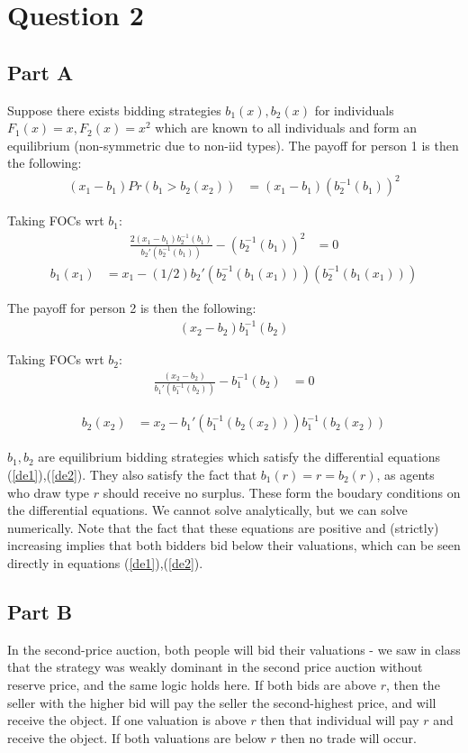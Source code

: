\documentclass[11pt]{article} %
\begin{document}
\section{Question 2}
\subsection{Part A}
Suppose there exists bidding strategies $b_1(x),b_2(x)$ for individuals $F_1(x) = x,F_2(x) = x^2$ which are known to all individuals and form an equilibrium (non-symmetric due to non-iid types). The payoff for person 1 is then the following:
\begin{align*}
(x_1-b_1)Pr(b_1>b_2(x_2)) &= (x_1-b_1)(b_2^{-1}(b_1))^2
\end{align*}

Taking FOCs wrt $b_1$:
\begin{align*}
\frac{2(x_1 - b_1)b_2^{-1}(b_1)}{b_2'(b_2^{-1}(b_1))}-(b_2^{-1}(b_1))^2 &= 0
\end{align*}
\begin{align}
b_1(x_1) &= x_1 - (1/2)b_2'(b_2^{-1}(b_1(x_1)))(b_2^{-1}(b_1(x_1)))  \label{de1}
\end{align}

The payoff for person 2 is then the following:
\begin{align*}
(x_2-b_2)b_1^{-1}(b_2)
\end{align*}

Taking FOCs wrt $b_2$:
\begin{align*}
\frac{(x_2 - b_2)}{b_1'(b_1^{-1}(b_2))}-b_1^{-1}(b_2) &= 0
\end{align*}

\begin{align}
b_2(x_2) &= x_2 - b_1'(b_1^{-1}(b_2(x_2)))b_1^{-1}(b_2(x_2)) \label{de2}
\end{align}

$b_1,b_2$ are equilibrium bidding strategies which satisfy the differential equations (\ref{de1}),(\ref{de2}). They also satisfy the fact that $b_1(r) = r = b_2(r)$, as agents who draw type $r$ should receive no surplus. These form the boudary conditions on the differential equations. We cannot solve analytically, but we can solve numerically. Note that the fact that these equations are positive and (strictly) increasing implies that both bidders bid below their valuations, which can be seen directly in equations (\ref{de1}),(\ref{de2}).
\subsection{Part B}
In the second-price auction, both people will bid their valuations - we saw in class that the strategy was weakly dominant in the second price auction without reserve price, and the same logic holds here. If both bids are above $r$, then the seller with the higher bid will pay the seller the second-highest price, and will receive the object. If one valuation is above $r$ then that individual will pay $r$ and receive the object. If both valuations are below $r$ then no trade will occur.
\end{document}
